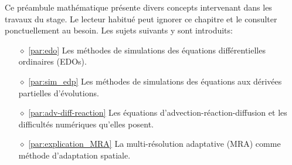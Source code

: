 Ce préambule mathématique présente divers concepts intervenant dans les travaux du stage. Le lecteur habitué peut ignorer ce chapitre et 
le consulter ponctuellement au besoin. Les sujets suivants y sont introduits:
\begin{itemize}
    \item[$\diamond$] \ref{par:edo} Les méthodes de simulations des équations différentielles ordinaires (EDOs).
    \item[$\diamond$] \ref{par:sim_edp} Les méthodes de simulations des équations aux dérivées partielles d'évolutions.
    \item[$\diamond$] \ref{par:adv-diff-reaction} Les équations d'advection-réaction-diffusion et les difficultés numériques qu'elles posent.
    \item[$\diamond$] \ref{par:explication_MRA} La multi-résolution adaptative (MRA) comme méthode d'adaptation spatiale.
\end{itemize}